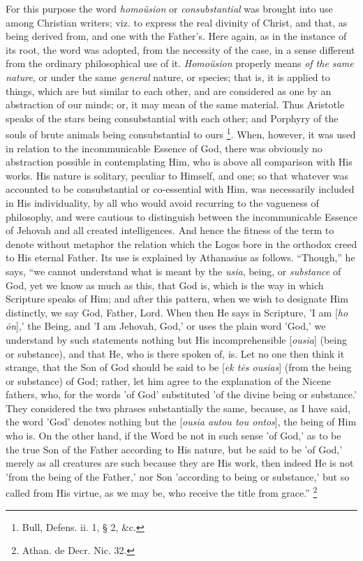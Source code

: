 For this purpose the word \emph{homoüsion} or \emph{consubstantial}
was brought into use among Christian writers; viz. to express the real
divinity of Christ, and that, as being derived from, and one with the
Father's. Here again, as in the instance of its root, the word was
adopted, from the necessity of the case, in a sense different
from the ordinary philosophical use of it. \emph{Homoüsion} properly
means \emph{of the same nature}, or under the same \emph{general} nature, or
species; that is, it is applied to things, which are but similar to
each other, and are considered as one by an abstraction of our minds;
or, it may mean of the same material. Thus Aristotle speaks of the
stars being consubstantial with each other; and Porphyry of the souls
of brute animals being consubstantial to ours \footnote{Bull, Defens. ii. 1, § 2, \&c.}. When, however, it was used in relation to the incommunicable
Essence of God, there was obviously no abstraction possible in
contemplating Him, who is above all comparison with His works. His
nature is solitary, peculiar to Himself, and one; so that whatever was
accounted to be consubstantial or co-essential with Him, was
necessarily included in His individuality, by all who would avoid
recurring to the vagueness of philosophy, and were cautious to
distinguish between the incommunicable Essence of Jehovah and all
created intelligences. And hence the fitness of the term to denote
without metaphor the relation which the Logos bore in the orthodox
creed to His eternal Father. Its use is explained by Athanasius as
follows. ``Though,'' he says, ``we cannot understand what
is meant by the \emph{usia}, being, or \emph{substance} of God, yet we
know as much as this, that God is, which is the way in which Scripture
speaks of Him; and after this pattern, when we wish to designate Him
distinctly, we say God, Father, Lord. When then He says in Scripture,
'I am [\emph{ho \={o}n}],' the Being, and 'I am Jehovah, God,' or
uses the plain word 'God,' we understand by such statements nothing
but His incomprehensible [\emph{ousia}] (being or substance),
and that He, who is there spoken of, is. Let no one then think it
strange, that the Son of God should be said to be [\emph{ek t\={e}s
ousias}] (from the being or substance) of God; rather, let him
agree to the explanation of the Nicene fathers, who, for the words 'of
God' substituted 'of the divine being or substance.' They considered
the two phrases substantially the same, because, as I have said, the
word 'God' denotes nothing but the [\emph{ousia autou tou ontos}], the
being of Him who is. On the other hand, if the Word be not in such
sense 'of God,' as to be the true Son of the Father according to His
nature, but be said to be 'of God,' merely as all creatures are such
because they are His work, then indeed He is not 'from the being of
the Father,' nor Son 'according to being or substance,' but so called
from His virtue, as we may be, who receive the title from grace.''
\footnote{Athan. de Decr. Nic. 32.}

